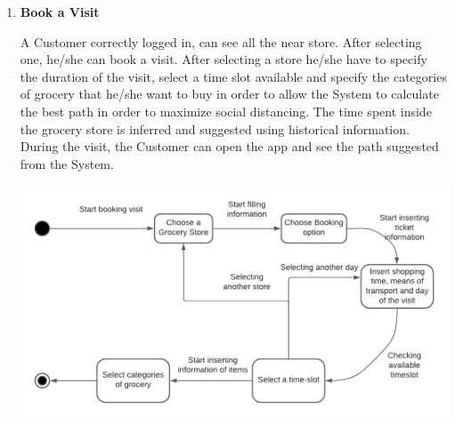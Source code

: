 \documentclass[a4paper, 10pt, oneside]{article}
\begin{document}
\begin{enumerate}
    \item \textbf{Book a Visit}
    \begin{flushleft}
       A Customer correctly logged in, can see all the near store. After selecting one, he/she can book a visit. After selecting a store he/she have to specify the duration of the visit, select a time slot available and specify the categories of grocery that he/she want to buy in order to allow the System to calculate the best path in order to maximize social distancing. The time spent inside the grocery store is inferred and suggested using historical information.
       During the visit, the Customer can open the app and see the path suggested from the System.
    \end{flushleft}
    \begin{minipage}{\linewidth}
            \centering
          \includegraphics[height=0.3\textheight, scale=0.2, keepaspectratio]{img/Booking_diagram.png}
        \end{minipage}
        

\end{enumerate}
\end{document}
